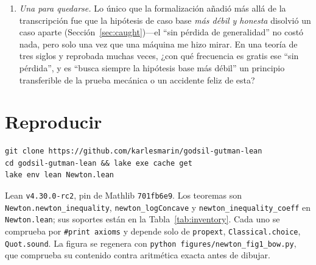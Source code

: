 \documentclass[11pt]{article}
\newcommand{\lean}[1]{\texttt{#1}}
\begin{document}
\begin{enumerate}
la lorentzianidad, y cu\'al es el fragmento formalizado m\'as peque\~no que lo har\'ia un piso de un
mismo edificio en vez de un hecho cl\'asico aislado?
\item \emph{Una para quedarse.} Lo \'unico que la formalizaci\'on a\~nadi\'o m\'as all\'a de la
transcripci\'on fue que la hip\'otesis de caso base \emph{m\'as d\'ebil y honesta} disolvi\'o un caso
aparte (Secci\'on~\ref{sec:caught})---el ``sin p\'erdida de generalidad'' no cost\'o nada, pero solo
una vez que una m\'aquina me hizo mirar. En una teor\'ia de tres siglos y reprobada muchas veces,
¿con qu\'e frecuencia es gratis ese ``sin p\'erdida'', y es ``busca siempre la hip\'otesis base m\'as
d\'ebil'' un principio transferible de la prueba mec\'anica o un accidente feliz de esta?
\end{enumerate}

\section*{Reproducir}
\begin{verbatim}
git clone https://github.com/karlesmarin/godsil-gutman-lean
cd godsil-gutman-lean && lake exe cache get
lake env lean Newton.lean
\end{verbatim}
Lean \lean{v4.30.0-rc2}, pin de Mathlib \lean{701fb6e9}. Los teoremas son
\lean{Newton.newton\_inequality}, \lean{newton\_logConcave} y \lean{newton\_inequality\_coeff} en
\lean{Newton.lean}; sus soportes est\'an en la Tabla~\ref{tab:inventory}. Cada uno se comprueba por
\lean{\#print axioms} y depende solo de \lean{propext}, \lean{Classical.choice}, \lean{Quot.sound}.
La figura se regenera con \lean{python figures/newton\_fig1\_bow.py}, que comprueba su contenido
contra aritm\'etica exacta antes de dibujar.
\end{document}
